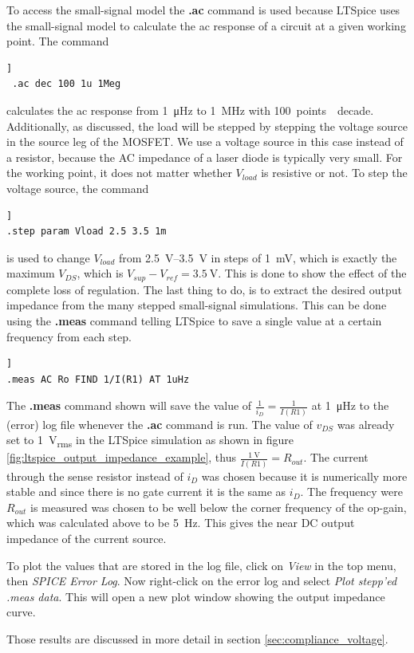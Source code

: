 \documentclass[12pt]{book}
\begin{document}
To access the small-signal model the \textbf{.ac} command is used because LTSpice uses the small-signal model to calculate the ac response of a circuit at a given working point. The command
\begin{lstlisting}[frame=single, xleftmargin=5mm, xrightmargin=5mm, columns=fullflexible, morekeywords={model, ac, dc, options}, keywordstyle=\bfseries, basicstyle=\rmfamily]]
 .ac dec 100 1u 1Meg
\end{lstlisting}
calculates the ac response from \qty{1}{\micro\hertz} to \qty{1}{\MHz} with \qty{100}{points \per decade}.
Additionally, as discussed, the load will be stepped by stepping the voltage source in the source leg of the MOSFET. We use a voltage source in this case instead of a resistor, because the AC impedance of a laser diode is typically very small. For the working point, it does not matter whether $V_{load}$ is resistive or not. To step the voltage source, the command
\begin{lstlisting}[frame=single, xleftmargin=5mm, xrightmargin=5mm, columns=fullflexible, morekeywords={model, ac, dc, options, step}, keywordstyle=\bfseries, basicstyle=\rmfamily]]
.step param Vload 2.5 3.5 1m
\end{lstlisting}
is used to change $V_{load}$ from \qtyrange[range-units = single]{2.5}{3.5}{\V} in steps of \qty{1}{\mV}, which is exactly the maximum $V_{DS}$, which is $V_{sup} - V_{ref} = \qty{3.5}{\V}$. This is done to show the effect of the complete loss of regulation. The last thing to do, is to extract the desired output impedance from the many stepped small-signal simulations. This can be done using the \textbf{.meas} command telling LTSpice to save a single value at a certain frequency from each step.
\begin{lstlisting}[frame=single, xleftmargin=5mm, xrightmargin=5mm, columns=fullflexible, morekeywords={model, ac, dc, options, step, meas}, keywordstyle=\bfseries, basicstyle=\rmfamily]]
.meas AC Ro FIND 1/I(R1) AT 1uHz
\end{lstlisting}
The \textbf{.meas} command shown will save the value of $\frac{1}{i_{D}} = \frac{1}{I(R1)}$ at \qty{1}{\micro\hertz} to the (error) log file whenever the \textbf{.ac} command is run. The value of $v_{DS}$ was already set to \qty{1}{\V_{rms}} in the LTSpice simulation as shown in figure \ref{fig:ltspice_output_impedance_example}, thus $\frac{\qty{1}{\V}}{I(R1)} = R_{out}$. The current through the sense resistor instead of $i_D$ was chosen because it is numerically more stable and since there is no gate current it is the same as $i_D$. The frequency were $R_{out}$ is measured was chosen to be well below the corner frequency of the op-gain, which was calculated above to be \qty{5}{\Hz}. This gives the near DC output impedance of the current source.

To plot the values that are stored in the log file, click on \textit{View} in the top menu, then \textit{SPICE Error Log}. Now right-click on the error log and select \textit{Plot stepp'ed .meas data}. This will open a new plot window showing the output impedance curve.

Those results are discussed in more detail in section \ref{sec:compliance_voltage}.
\end{document}
